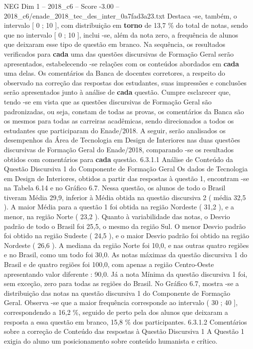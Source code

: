 \begin{textsample}{NEG Dim 1 – 2018\_c6 – Score -3.00 – 2018\_c6/enade\_2018\_tec\_des\_inter\_0a7fad3a23.txt}
Destaca -se, também, o intervalo [ 0 ; 10 ], com distribuição em \textbf{torno} de 13,7 \% do total de notas, sendo que no intervalo [ 0 ; 10 ], inclui -se, além da nota zero, a frequência de alunos que deixaram esse tipo de questão em branco.
Na sequência, os resultados verificados para \textbf{cada} uma das questões discursivas de Formação Geral serão apresentados, estabelecendo -se relações com os conteúdos abordados em \textbf{cada} uma delas.
Os comentários da Banca de docentes corretores, a respeito do observado na correção das respostas dos estudantes, suas impressões e conclusões serão apresentados junto à análise de \textbf{cada} questão.
Cumpre esclarecer que, tendo -se em vista que as questões discursivas de Formação Geral são padronizadas, ou seja, constam de todas as provas, os comentários da Banca são os mesmos para todas as carreiras acadêmicas, sendo direcionados a todos os estudantes que participaram do Enade/2018.
A seguir, serão analisados os desempenhos da Área de Tecnologia em Design de Interiores nas duas questões discursivas de Formação Geral do Enade/2018, comparando -se os resultados obtidos com comentários para \textbf{cada} questão. 6.3.1.1 Análise de Conteúdo da Questão Discursiva 1 do Componente de Formação Geral Os dados de Tecnologia em Design de Interiores, obtidos a partir das respostas à questão 1, encontram -se na Tabela 6.14 e no Gráfico 6.7.
Nessa questão, os alunos de todo o Brasil tiveram Média 29,9, inferior à Média obtida na questão discursiva 2 ( média 32,5 ).
A maior Média para a questão 1 foi obtida na região Nordeste ( 31,2 ), e a menor, na região Norte ( 23,2 ).
Quanto à variabilidade das notas, o Desvio padrão de todo o Brasil foi 25,5, o mesmo da região Sul.
O menor Desvio padrão foi obtido na região Sudeste ( 24,5 ), e o maior Desvio padrão foi obtido na região Nordeste ( 26,6 ).
A mediana da região Norte foi 10,0, e nas outras quatro regiões e no Brasil, como um todo foi 30,0.
As notas máximas da questão discursiva 1 do Brasil e de quatro regiões foi 100,0, com apenas a região Centro-Oeste apresentando valor diferente : 90,0.
Já a nota Mínima da questão discursiva 1 foi, sem exceção, zero para todas as regiões do Brasil.
No Gráfico 6.7, mostra -se a distribuição das notas na questão discursiva 1 do Componente de Formação Geral.
Observa -se que a maior frequência corresponde ao intervalo ( 30 ; 40 ], correspondendo a 16,2 \%, seguido de perto pela dos alunos que deixaram a resposta a essa questão em branco, 15,8 \% dos participantes. 6.3.1.2 Comentários sobre a correção de Conteúdo das respostas à Questão Discursiva 1 A Questão 1 exigia do aluno um posicionamento sobre conteúdo humanista e crítico.

\end{textsample}

